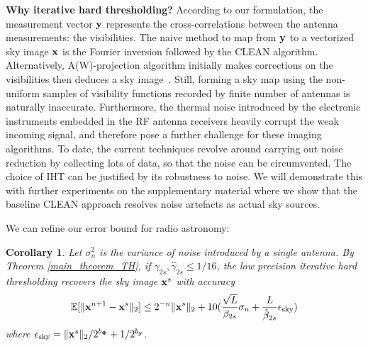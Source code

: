 \documentclass{article}
\newtheorem{corollary}{Corollary}
\begin{document}
{\bf Why iterative hard thresholding?} According to our formulation, the measurement vector ${\bf y}$ represents the cross-correlations between the antenna measurements: the visibilities. The naive method to map from ${\bf y}$ to a vectorized sky image ${\bf x}$ is the Fourier inversion followed by the {CLEAN} algorithm. Alternatively, {A(W)-projection} algorithm initially makes corrections on the visibilities then deduces a sky image~\cite{bhatganar2008ra}. Still, forming a sky map using the non-uniform samples of visibility functions recorded by finite number of antennas is naturally inaccurate. Furthermore, the thermal noise introduced by the electronic instruments embedded in the RF antenna receivers heavily corrupt the weak incoming signal, and therefore pose a further challenge for these imaging algorithms. To date, the current techniques revolve around carrying out noise reduction by collecting lots of data, so that the noise can be circumvented. The choice of IHT can be justified by its robustness to noise. We will demonstrate this with further experiments on the supplementary material where we show that the baseline {CLEAN} approach resolves noise artefacts as actual sky sources.
\vspace{-.1em}

We can refine our error bound for radio astronomy:
\vspace{-.2em}

\begin{corollary}
Let $\sigma_n^2$ is the variance of noise introduced by a single antenna. By Theorem \ref{main_theorem_TH}, if ${\gamma}_{2s}, \hat{\gamma}_{2s}\leq 1/16$, the low precision iterative hard thresholding recovers the sky image ${\bf x}^s$ with accuracy
\begin{equation}
    \mathbb{E}[\|{\bf x}^{n+1} - {\bf x}^s \|_2] \leq 2^{-n}\| {\bf x}^s\|_2 + 10(\frac{\sqrt{L}}{\beta_{2s}}\sigma_n+\frac{L}{\hat{\beta}_{2s}}\epsilon_{\rm{sky}})
\end{equation}
where $\epsilon_{\rm{sky}} =  \|{\bf x}^s \|_2/2^{b_{\bf \Phi}} + 1/2^{b_{\bf y}}$.
\label{corollary1}
\end{corollary}


\end{document}
